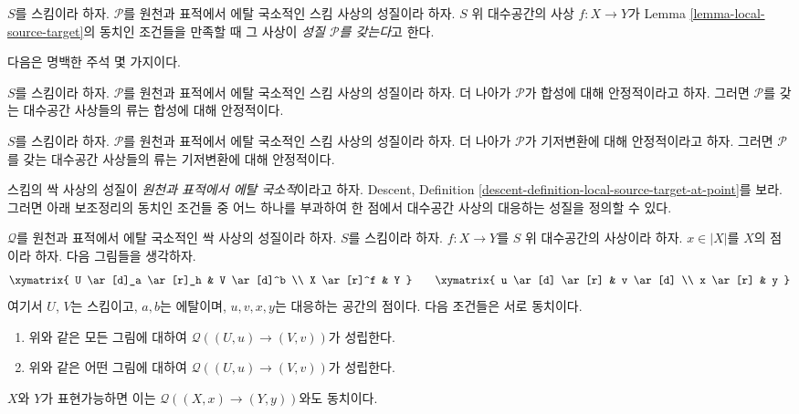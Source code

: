 \begin{definition}
\label{definition-P}
$S$를 스킴이라 하자.
$\mathcal{P}$를 원천과 표적에서 에탈 국소적인 스킴 사상의 성질이라
하자.
$S$ 위 대수공간의 사상 $f : X \to Y$가 Lemma
\ref{lemma-local-source-target}의 동치인 조건들을 만족할 때
그 사상이 {\it 성질 $\mathcal{P}$를 갖는다}고 한다.
\end{definition}

\noindent
다음은 명백한 주석 몇 가지이다.

\begin{remark}
\label{remark-composition-P}
$S$를 스킴이라 하자. $\mathcal{P}$를 원천과 표적에서 에탈 국소적인
스킴 사상의 성질이라 하자. 더 나아가 $\mathcal{P}$가 합성에 대해
안정적이라고 하자. 그러면 $\mathcal{P}$를 갖는 대수공간 사상들의
류는 합성에 대해 안정적이다.
\end{remark}

\begin{remark}
\label{remark-base-change-P}
$S$를 스킴이라 하자. $\mathcal{P}$를 원천과 표적에서 에탈 국소적인
스킴 사상의 성질이라 하자. 더 나아가 $\mathcal{P}$가 기저변환에
대해 안정적이라고 하자. 그러면 $\mathcal{P}$를 갖는 대수공간
사상들의 류는 기저변환에 대해 안정적이다.
\end{remark}

\noindent
스킴의 싹 사상의 성질이 {\it 원천과 표적에서 에탈 국소적}이라고
하자. Descent, Definition
\ref{descent-definition-local-source-target-at-point}를 보라.
그러면 아래 보조정리의 동치인 조건들 중 어느 하나를 부과하여
한 점에서 대수공간 사상의 대응하는 성질을 정의할 수 있다.

\begin{lemma}
\label{lemma-local-source-target-at-point}
$\mathcal{Q}$를 원천과 표적에서 에탈 국소적인 싹 사상의 성질이라
하자. $S$를 스킴이라 하자.
$f : X \to Y$를 $S$ 위 대수공간의 사상이라 하자.
$x \in |X|$를 $X$의 점이라 하자. 다음 그림들을 생각하자.
$$
\xymatrix{
U \ar[d]_a \ar[r]_h & V \ar[d]^b \\
X \ar[r]^f & Y
}
\quad\quad
\xymatrix{
u \ar[d] \ar[r] & v \ar[d] \\
x \ar[r] & y
}
$$
여기서 $U$, $V$는 스킴이고, $a, b$는 에탈이며,
$u, v, x, y$는 대응하는 공간의 점이다.
다음 조건들은 서로 동치이다.
\begin{enumerate}
\item 위와 같은 모든 그림에 대하여
$\mathcal{Q}((U, u) \to (V, v))$가 성립한다.
\item 위와 같은 어떤 그림에 대하여
$\mathcal{Q}((U, u) \to (V, v))$가 성립한다.
\end{enumerate}
$X$와 $Y$가 표현가능하면 이는
$\mathcal{Q}((X, x) \to (Y, y))$와도 동치이다.
\end{lemma}

